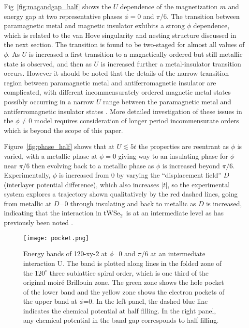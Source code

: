 \documentclass[%
reprint,
superscriptaddress,
twocolumn,
 amsmath,amssymb,
 aps,
 prb,
]{revtex4-2}
\newcommand{\twsetwo}{tWSe$_2$}
\begin{document}
Fig~\ref{fig:magandgap_half} shows the $U$ dependence of the magnetization $m$ and energy gap at two representative phases $\phi=0$ and $\pi/6$. The transition between paramagnetic metal and magnetic insulator exhibits a strong $\phi$ dependence, which is related to the van Hove singularity and nesting structure discussed in the next section. The transition is found to be two-staged for almost all values of $\phi$. As $U$ is increased a first transition to a magnetically ordered but still metallic state is observed, and then as $U$ is increased further a metal-insulator transition occurs. 
However it should be noted that the details of the narrow transition region between paramagnetic metal and antiferromagnetic insulator are complicated, with different incommensurately ordered magnetic metal states possibly occurring in a narrow $U$ range between the paramagnetic metal and antiferromagnetic insulator states \cite{krishnamurthy1990mott,Jayaprakash_1991}. More detailed investigation of these issues in the $\phi \neq 0$ model requires consideration of longer period incommensurate orders which is beyond the scope of this paper.  

Figure~\ref{fig:phase_half} shows that at $U\lesssim 5t$ the properties are reentrant as $\phi$ is varied, with a metallic phase at $\phi=0$ giving way to an insulating phase for $\phi$ near $\pi/6$ then evolving back to a metallic phase as $\phi$ is increased beyond $\pi/6$. Experimentally, $\phi$ is increased from 0 by varying the ``displacement field'' $D$ (interlayer potential difference), which also increases $|t|$, so the experimental system explores a trajectory shown qualitatively by the red dashed lines, going from metallic at $D$=0 through insulating and back to metallic as $D$ is increased, indicating that the interaction in \twsetwo~is at an intermediate level as has previously been noted \cite{Wang:2020us,ghiotto2021quantum}. 


\begin{figure}[htbp]
  \texttt{[image: pocket.png]}
  \caption{Energy bands of 120-xy-2 at $\phi$=0 and $\pi/6$ at an intermediate interaction U. The band is plotted along lines in the folded zone of the $120^{\circ}$ three sublattice spiral order, which is one third of the original moir\'e Brillouin zone. The green zone shows the hole pocket of the lower band and the yellow zone shows the electron pockets of the upper band at $\phi$=0. In the left panel, the dashed blue line indicates the chemical potential at half filling. In the right panel, any chemical potential in the band gap corresponds to half filling.}
  \label{fig:pocket}
\end{figure}
 
\end{document}
